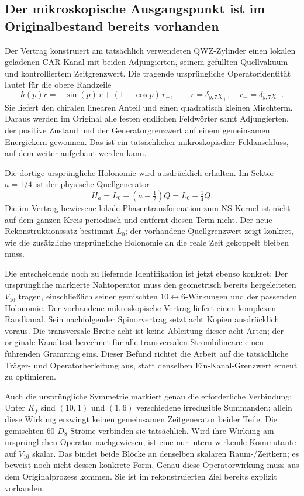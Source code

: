 \subsection{Der mikroskopische Ausgangspunkt ist im Originalbestand bereits vorhanden}
Der Vertrag  konstruiert am tatsächlich verwendeten QWZ-Zylinder einen lokalen geladenen CAR-Kanal mit beiden Adjungierten, seinem gefüllten Quellvakuum und kontrolliertem Zeitgrenzwert. Die tragende ursprüngliche Operatoridentität lautet für die obere Randzeile
\begin{equation}
h(p)r=-\sin(p)\,r+(1-\cos p)\,r_-,
\qquad r=\delta_{y,7}\chi_+,\quad r_-=\delta_{y,7}\chi_-.
\end{equation}
Sie liefert den chiralen linearen Anteil und einen quadratisch kleinen Mischterm. Daraus werden im Original alle festen endlichen Feldwörter samt Adjungierten, der positive Zustand und der Generatorgrenzwert auf einem gemeinsamen Energiekern gewonnen. Das ist ein tatsächlicher mikroskopischer Feldanschluss, auf dem weiter aufgebaut werden kann.

Die dortige ursprüngliche Holonomie wird ausdrücklich erhalten. Im Sektor $a=1/4$ ist der physische Quellgenerator
\begin{equation}
H_a=L_0+(a-\tfrac12)Q=L_0-\tfrac14 Q.
\end{equation}
Die im Vertrag  bewiesene lokale Phasentransformation zum NS-Kernel ist nicht auf dem ganzen Kreis periodisch und entfernt diesen Term nicht. Der neue Rekonstruktionssatz bestimmt $L_0$; der vorhandene Quellgrenzwert zeigt konkret, wie die zusätzliche ursprüngliche Holonomie an die reale Zeit gekoppelt bleiben muss.

Die entscheidende noch zu liefernde Identifikation ist jetzt ebenso konkret: Der ursprüngliche markierte Nahtoperator muss den geometrisch bereits hergeleiteten $V_{16}$ tragen, einschließlich seiner gemischten $10\leftrightarrow6$-Wirkungen und der passenden Holonomie. Der vorhandene mikroskopische Vertrag liefert einen komplexen Randkanal. Sein nachfolgender Spinorvertrag setzt acht Kopien ausdrücklich voraus. Die transversale Breite acht ist keine Ableitung dieser acht Arten; der originale Kanaltest berechnet für alle transversalen Strombilineare einen führenden Gramrang eins. Dieser Befund richtet die Arbeit auf die tatsächliche Träger- und Operatorherleitung aus, statt denselben Ein-Kanal-Grenzwert erneut zu optimieren.

Auch die ursprüngliche Symmetrie markiert genau die erforderliche Verbindung: Unter $K_f$ sind $(10,1)$ und $(1,6)$ verschiedene irreduzible Summanden; allein diese Wirkung erzwingt keinen gemeinsamen Zeitgenerator beider Teile. Die gemischten $60$ $D_8$-Ströme verbinden sie tatsächlich. Wird ihre Wirkung am ursprünglichen Operator nachgewiesen, ist eine nur intern wirkende Kommutante auf $V_{16}$ skalar. Das bindet beide Blöcke an denselben skalaren Raum-/Zeitkern; es beweist noch nicht dessen konkrete Form. Genau diese Operatorwirkung muss aus dem Originalprozess kommen. Sie ist im rekonstruierten Ziel bereits explizit vorhanden.

